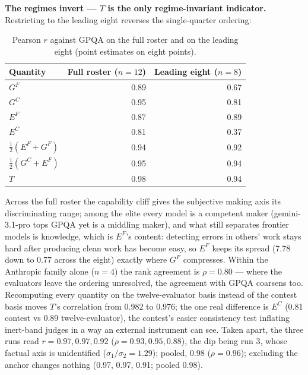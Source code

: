 \documentclass{article}
\begin{document}
\textbf{The regimes invert --- \(T\) is the only regime-invariant indicator.} Restricting to the leading eight reverses the single-quarter ordering:

\begin{table}[H]
\caption{Pearson \(r\) against GPQA on the full roster and on the leading eight (point estimates on eight points).}
\begin{center}\small
\begin{tabular}{@{}lrr@{}}
\toprule\noalign{}
Quantity & Full roster (\(n=12\)) & Leading eight (\(n=8\)) \\
\midrule\noalign{}
\(G^{F}\) &\cellcolor[HTML]{22318D}\textcolor[HTML]{EEF3F8}{0.89}&\cellcolor[HTML]{1F7FB7}\textcolor[HTML]{EEF3F8}{0.67} \\
\(G^{C}\) &\cellcolor[HTML]{142670}\textcolor[HTML]{EEF3F8}{0.95}&\cellcolor[HTML]{234A9E}\textcolor[HTML]{EEF3F8}{0.81} \\
\(E^{F}\) &\cellcolor[HTML]{253695}\textcolor[HTML]{EEF3F8}{0.87}&\cellcolor[HTML]{22318D}\textcolor[HTML]{EEF3F8}{0.89} \\
\(E^{C}\) &\cellcolor[HTML]{234A9E}\textcolor[HTML]{EEF3F8}{0.81}&\cellcolor[HTML]{82CEBB}\textcolor[HTML]{1A1A1A}{0.37} \\
\(\tfrac12(E^{F}+G^{F})\) &\cellcolor[HTML]{162875}\textcolor[HTML]{EEF3F8}{0.94}&\cellcolor[HTML]{1B2C7E}\textcolor[HTML]{EEF3F8}{0.92} \\
\(\tfrac12(G^{C}+E^{F})\) &\cellcolor[HTML]{142670}\textcolor[HTML]{EEF3F8}{0.95}&\cellcolor[HTML]{162875}\textcolor[HTML]{EEF3F8}{0.94} \\
\(T\) &\cellcolor[HTML]{0D2162}\textcolor[HTML]{EEF3F8}{0.98}&\cellcolor[HTML]{162875}\textcolor[HTML]{EEF3F8}{0.94} \\
\bottomrule
\end{tabular}
\end{center}
\end{table}

Across the full roster the capability cliff gives the subjective making axis its discriminating range; among the elite every model is a competent maker (gemini-3.1-pro tops GPQA yet is a middling maker), and what still separates frontier models is knowledge, which is \(E^{F}\)'s content: detecting errors in others' work stays hard after producing clean work has become easy, so \(E^{F}\) keeps its spread (7.78 down to 0.77 across the eight) exactly where \(G^{F}\) compresses. Within the Anthropic family alone (\(n = 4\)) the rank agreement is \(\rho = 0.80\) --- where the evaluators leave the ordering unresolved, the agreement with GPQA coarsens too. Recomputing every quantity on the twelve-evaluator basis instead of the contest basis moves \(T\)'s correlation from 0.982 to 0.976; the one real difference is \(E^{C}\) (0.81 contest vs 0.89 twelve-evaluator), the contest's easier consistency test inflating inert-band judges in a way an external instrument can see. Taken apart, the three runs read \(r = 0.97, 0.97, 0.92\) (\(\rho = 0.93, 0.95, 0.88\)), the dip being run 3, whose factual axis is unidentified (\(\sigma_1/\sigma_2 = 1.29\)); pooled, 0.98 (\(\rho = 0.96\)); excluding the anchor changes nothing (0.97, 0.97, 0.91; pooled 0.98).
\end{document}
